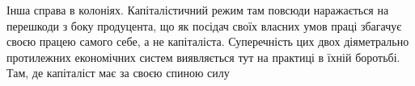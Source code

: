 Інша справа в колоніях. Капіталістичний режим там повсюди
наражається на перешкоди з боку продуцента, що як посідач
своїх власних умов праці збагачує своєю працею самого
себе, а не капіталіста. Суперечність цих двох діяметрально протилежних
економічних систем виявляється тут на практиці
в їхній боротьбі. Там, де капіталіст має за своєю спиною силу
\parbreak{}  %
